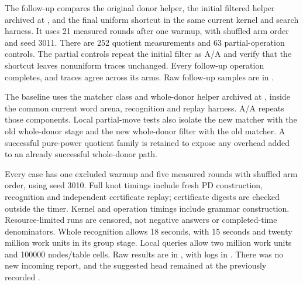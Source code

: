 The follow-up compares the original donor helper, the initial filtered
helper archived at , and the final uniform shortcut in the
same current kernel and search harness. It uses 21 measured rounds after
one warmup, with shuffled arm order and seed 3011. There are 252 quotient
measurements and 63 partial-operation controls. The partial controls repeat
the initial filter as A/A and verify that the shortcut leaves nonuniform
traces unchanged. Every follow-up operation completes, and traces agree
across its arms. Raw follow-up samples are in
.


The baseline uses the matcher class and whole-donor helper archived at
, inside the common current word arena, recognition and
replay harness. A/A repeats those components. Local partial-move tests
also isolate the new matcher with the old whole-donor stage and the new
whole-donor filter with the old matcher. A successful pure-power quotient
family is retained to expose any overhead added to an already successful
whole-donor path.

Every case has one excluded warmup and five measured rounds with shuffled
arm order, using seed 3010. Full knot timings include fresh PD construction,
recognition and independent certificate replay; certificate digests are
checked outside the timer. Kernel and operation timings include grammar
construction. Resource-limited runs are censored, not negative answers
or completed-time denominators. Whole recognition allows 18 seconds,
with 15 seconds and twenty million work units in its group stage. Local
queries allow two million work units and 100000 nodes/table cells.
Raw results are in , with
logs in . There was no new incoming
report, and the suggested  head remained at the previously
recorded .
